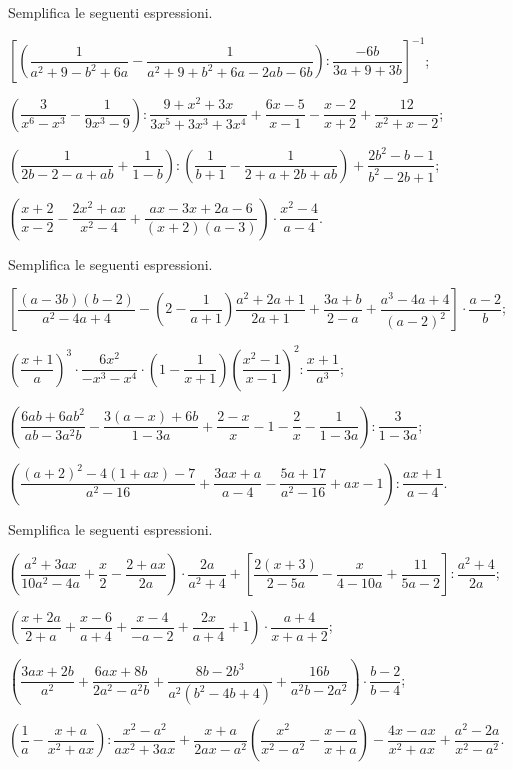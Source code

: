 \begin{esercizio}[\Ast]
\label{ese:14.51}
Semplifica le seguenti espressioni.
\begin{enumeratea}
 \item $\left[\left(\dfrac{1}{a^{2}+9-b^{2}+6a}-\dfrac{1}{a^{2}+9+b^{2}+6a-2ab-6b}\right):\dfrac{-6b}{3a+9+3b}\right]^{-1}$;
 \item $\left(\dfrac{3}{x^{6}-x^{3}}-\dfrac{1}{9x^{3}-9}\right):\dfrac{9+x^{2}+3x}{3x^{5}+3x^{3}+3x^{4}}+\dfrac{6x-5}{x-1}-\dfrac{x-2}{x+2}+\dfrac{12}{x^{2}+x-2}$;
 \item $\left(\dfrac{1}{2b-2-a+ab}+\dfrac{1}{1-b}\right):\left(\dfrac{1}{b+1}-\dfrac{1}{2+a+2b+ab}\right)+\dfrac{2b^{2}-b-1}{b^{2}-2b+1}$;
 \item $\left(\dfrac{x+2}{x-2}-\dfrac{2x^{2}+ax}{x^{2}-4}+\dfrac{ax-3x+2a-6}{(x+2)(a-3)}\right)\cdot {\dfrac{x^{2}-4}{a-4}}$.
\end{enumeratea}
\end{esercizio}

\begin{esercizio}[\Ast]
\label{ese:14.52}
Semplifica le seguenti espressioni.
\begin{enumeratea}
 \item $\left[\dfrac{(a-3b)(b-2)}{a^{2}-4a+4}-\left(2-\dfrac{1}{a+1}\right)\dfrac{a^{2}+2a+1}{2a+1}+\dfrac{3a+b}{2-a}+\dfrac{a^{3}-4a+4}{(a-2)^{2}}\right]\cdot {\dfrac{a-2}{b}}$;
 \item $\left(\dfrac{x+1}{a}\right)^{3}\cdot\dfrac{6x^{2}}{-x^{3}-x^{4}}\cdot \left(1-\dfrac{1}{x+1}\right)\left(\dfrac{x^{2}-1}{x-1}\right)^{2}:\dfrac{x+1}{a^{3}}$;
 \item $\left(\dfrac{6ab+6ab^{2}}{ab-3a^{2}b}-\dfrac{3(a-x)+6b}{1-3a}+\dfrac{2-x}{x}-1-\dfrac{2}{x}-\dfrac{1}{1-3a}\right):\dfrac{3}{1-3a}$;
 \item $\left(\dfrac{(a+2)^{2}-4(1+ax)-7}{a^{2}-16}+\dfrac{3ax+a}{a-4}-\dfrac{5a+17}{a^{2}-16}+ax-1\right):\dfrac{ax+1}{a-4}$.
\end{enumeratea}
\end{esercizio}

\begin{esercizio}[\Ast]
\label{ese:14.53}
Semplifica le seguenti espressioni.
\begin{enumeratea}
 \item $\left(\dfrac{a^{2}+3ax}{10a^{2}-4a}+\dfrac{x}{2}-\dfrac{2+ax}{2a}\right)\cdot {\dfrac{2a}{a^{2}+4}}+\left[\dfrac{2(x+3)}{2-5a}-\dfrac{x}{4-10a}+\dfrac{11}{5a-2}\right]:\dfrac{a^{2}+4}{2a}$;
 \item $\left(\dfrac{x+2a}{2+a}+\dfrac{x-6}{a+4}+\dfrac{x-4}{-a-2}+\dfrac{2x}{a+4}+1\right)\cdot{\dfrac{a+4}{x+a+2}}$;
 \item $\left(\dfrac{3ax+2b}{a^{2}}+\dfrac{6ax+8b}{2a^{2}-a^{2}b}+\dfrac{8b-2b^{3}}{a^{2}\left(b^{2}-4b+4\right)}+\dfrac{16b}{a^{2}b-2a^{2}}\right)\cdot {\dfrac{b-2}{b-4}}$;
 \item $\left(\dfrac{1}{a}-\dfrac{x+a}{x^{2}+ax}\right):\dfrac{x^{2}-a^{2}}{ax^2+3ax}+\dfrac{x+a}{2ax-a^{2}}\left(\dfrac{x^{2}}{x^{2}-a^{2}}-\dfrac{x-a}{x+a}\right)-\dfrac{4x-ax}{x^{2}+ax}+\dfrac{a^2-2a}{x^{2}-a^{2}}$.
\end{enumeratea}
\end{esercizio}

